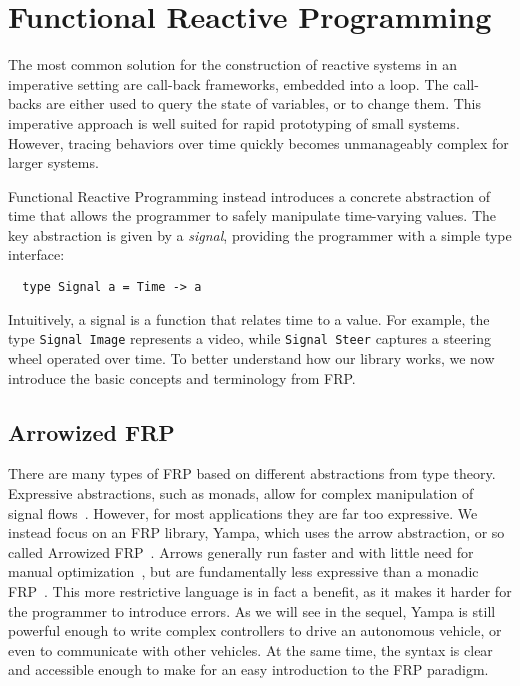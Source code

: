\section{Functional Reactive Programming}

The most common solution for the construction of reactive systems in an imperative setting are call-back frameworks, embedded into a loop.
The call-backs are either used to query the state of variables, or to change them.
This imperative approach is well suited for rapid prototyping of small systems.
However, tracing behaviors over time quickly becomes unmanageably complex for larger systems.

Functional Reactive Programming instead introduces a concrete abstraction of time that allows the programmer to safely manipulate time-varying values. 
The key abstraction is given by a \textit{signal}, providing the programmer with a simple type interface:

\begin{lstlisting}
  type Signal a = Time -> a
\end{lstlisting}

\noindent Intuitively, a signal is a function that relates time to a value.
For example, the type \texttt{Signal Image} represents a video, while \texttt{Signal Steer} captures a steering wheel operated over time.
To better understand how our library works, we now introduce the basic concepts and terminology from FRP.

\subsection{Arrowized FRP}

There are many types of FRP based on different abstractions from type theory.
Expressive abstractions, such as monads, allow for complex manipulation of signal flows~\cite{van2014monadic}. 
However, for most applications they are far too expressive.
We instead focus on an FRP library, Yampa, which uses the arrow abstraction, or so called Arrowized FRP~\cite{hudak2003arrows}.
Arrows generally run faster and with little need for manual optimization~\cite{yallop2016causal}, but are fundamentally less expressive than a monadic FRP~\cite{lindley2011idioms}.
This more restrictive language is in fact a benefit, as it makes it harder for the programmer to introduce errors.
As we will see in the sequel, Yampa is still powerful enough to write complex controllers to drive an autonomous vehicle, or even to communicate with other vehicles.
At the same time, the syntax is clear and accessible enough to make for an easy introduction to the FRP paradigm.


